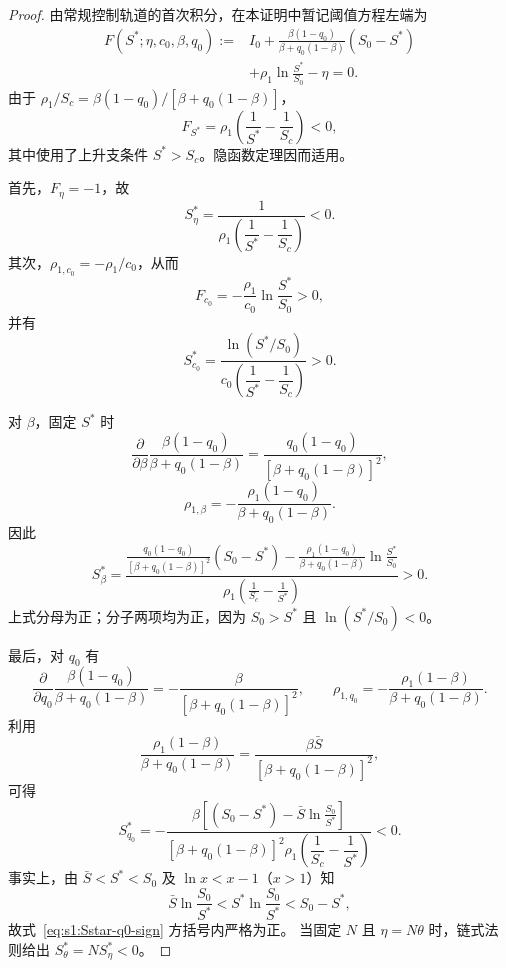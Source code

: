 \documentclass[lang=cn,a4paper,newtx]{elegantpaper}
\numberwithin{equation}{section}
\theoremstyle{plain}
\begin{document}
\begin{proof}
由常规控制轨道的首次积分，在本证明中暂记阈值方程左端为
\begin{equation}
\begin{aligned}
F(S^*;\eta,c_0,\beta,q_0)
:={}&
I_0+
\frac{\beta(1-q_0)}
{\beta+q_0(1-\beta)}
(S_0-S^*) \\
&+
\rho_1\ln\frac{S^*}{S_0}
-\eta
=0.
\end{aligned}
\label{eq:s1:F-Sstar-param}
\end{equation}
由于 $\rho_1/S_c=\beta(1-q_0)/[\beta+q_0(1-\beta)]$，
\[
F_{S^*}
=
\rho_1
\left(
\frac1{S^*}-\frac1{S_c}
\right)<0,
\]
其中使用了上升支条件 $S^*>S_c$。隐函数定理因而适用。

首先，$F_\eta=-1$，故
\begin{equation}
S^*_\eta
=
\frac{1}{
\rho_1
\left(
\dfrac1{S^*}-\dfrac1{S_c}
\right)
}
<0.
\label{eq:s1:Sstar-eta-sign}
\end{equation}
其次，$\rho_{1,c_0}=-\rho_1/c_0$，从而
\[
F_{c_0}
=
-\frac{\rho_1}{c_0}\ln\frac{S^*}{S_0}>0,
\]
并有
\begin{equation}
S^*_{c_0}
=
\frac{\ln(S^*/S_0)}
{c_0
\left(
\dfrac1{S^*}-\dfrac1{S_c}
\right)
}
>0.
\label{eq:s1:Sstar-c0-sign}
\end{equation}

对 $\beta$，固定 $S^*$ 时
\[
\frac{\partial}{\partial\beta}
\frac{\beta(1-q_0)}
{\beta+q_0(1-\beta)}
=
\frac{q_0(1-q_0)}
{\left[\beta+q_0(1-\beta)\right]^2},
\]
\[
\rho_{1,\beta}
=
-\frac{\rho_1(1-q_0)}
{\beta+q_0(1-\beta)}.
\]
因此
\begin{equation}
S^*_\beta
=
\frac{
\displaystyle
\frac{q_0(1-q_0)}
{\left[\beta+q_0(1-\beta)\right]^2}
(S_0-S^*)
-
\frac{\rho_1(1-q_0)}
{\beta+q_0(1-\beta)}
\ln\frac{S^*}{S_0}
}{
\displaystyle
\rho_1
\left(
\frac1{S_c}-\frac1{S^*}
\right)
}
>0.
\label{eq:s1:Sstar-beta-sign}
\end{equation}
上式分母为正；分子两项均为正，因为
$S_0>S^*$ 且 $\ln(S^*/S_0)<0$。

最后，对 $q_0$ 有
\[
\frac{\partial}{\partial q_0}
\frac{\beta(1-q_0)}
{\beta+q_0(1-\beta)}
=
-\frac{\beta}
{\left[\beta+q_0(1-\beta)\right]^2},
\qquad
\rho_{1,q_0}
=
-\frac{\rho_1(1-\beta)}
{\beta+q_0(1-\beta)}.
\]
利用
\[
\frac{\rho_1(1-\beta)}
{\beta+q_0(1-\beta)}
=
\frac{\beta\bar S}
{\left[\beta+q_0(1-\beta)\right]^2},
\]
可得
\begin{equation}
S^*_{q_0}
=
-\frac{
\beta
\left[
(S_0-S^*)
-\bar S\ln\frac{S_0}{S^*}
\right]
}{
\left[\beta+q_0(1-\beta)\right]^2
\rho_1
\left(
\dfrac1{S_c}-\dfrac1{S^*}
\right)
}
<0.
\label{eq:s1:Sstar-q0-sign}
\end{equation}
事实上，由 $\bar S<S^*<S_0$ 及 $\ln x<x-1$（$x>1$）知
\[
\bar S\ln\frac{S_0}{S^*}
<
S^*\ln\frac{S_0}{S^*}
<
S_0-S^*,
\]
故式~\eqref{eq:s1:Sstar-q0-sign} 方括号内严格为正。
当固定 $N$ 且 $\eta=N\theta$ 时，链式法则给出
$S^*_\theta=NS^*_\eta<0$。
\end{proof}
\end{document}

